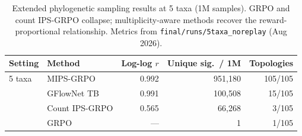 \begin{table}[htbp]
\centering
\caption{Extended phylogenetic sampling results at 5 taxa (1M samples).
GRPO and count IPS-GRPO collapse; multiplicity-aware methods recover the
reward-proportional relationship. Metrics from \texttt{final/runs/5taxa\_noreplay}
(Aug 2026).}
\label{tab:phylo-extended}
\begin{tabular}{llrrr}
\toprule
Setting & Method & Log-log $r$ & Unique sig.\ / 1M & Topologies \\
\midrule
5 taxa & MIPS-GRPO & 0.992 & 951{,}180 & 105/105 \\
       & GFlowNet TB & 0.991 & 100{,}508 & 15/105 \\
       & Count IPS-GRPO & 0.565 & 66{,}268 & 3/105 \\
       & GRPO & --- & 1 & 1/105 \\
\bottomrule
\end{tabular}
\end{table}
